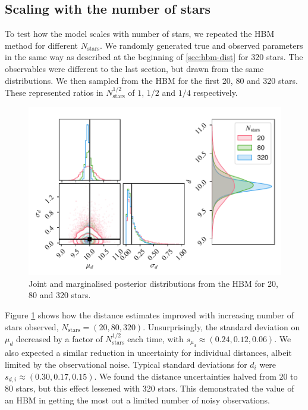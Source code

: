 \subsection{Scaling with the number of stars}

To test how the model scales with number of stars, we repeated the HBM method for different \(N_\mathrm{stars}\). We randomly generated true and observed parameters in the same way as described at the beginning of \ref{sec:hbm-dist} for 320 stars. The observables were different to the last section, but drawn from the same distributions. We then sampled from the HBM for the first 20, 80 and 320 stars. These represented ratios in \(N_\mathrm{stars}^{1/2}\) of \(1\), \(1/2\) and \(1/4\) respectively.

\begin{figure}[tb]
    \centering
    \includegraphics{figures/hbm-extended.pdf}
    \caption{Joint and marginalised posterior distributions from the HBM for 20, 80 and 320 stars.}
    \label{fig:hbm-extended}
\end{figure}

Figure \ref{fig:hbm-extended} shows how the distance estimates improved with increasing number of stars observed, \(N_\mathrm{stars}=(20,80,320)\). Unsurprisingly, the standard deviation on \(\mu_d\) decreased by a factor of \(N_\mathrm{stars}^{1/2}\) each time, with \(s_{\mu_d} \approx (0.24, 0.12, 0.06)\). We also expected a similar reduction in uncertainty for individual distances, albeit limited by the observational noise. Typical standard deviations for \(d_i\) were \(s_{d,i} \approx (0.30, 0.17, 0.15)\). We found the distance uncertainties halved from \(20\) to \(80\) stars, but this effect lessened with 320 stars. This demonstrated the value of an HBM in getting the most out a limited number of noisy observations.

